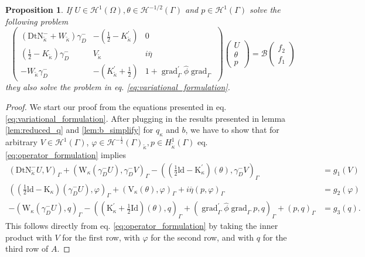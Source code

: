 \documentclass[12pt,journal,compsoc, onecolumn]{IEEEtran}
\newtheorem{proposition}[theorem]{Proposition}
\begin{document}
\begin{proposition}
\label{prop:operator_formulation}
If \(U \in \mathcal{H}^{1}(\Omega), \theta \in \mathcal{H}^{-1 / 2}(\Gamma)\) and \(p \in \mathcal{H}^{1}(\Gamma)\) solve the following problem 
    \begin{equation}
    \label{eq:operator_formulation}
        \begin{pmatrix}
            (\mathrm{DtN}_{\tilde \kappa}^{-} + W_{\tilde \kappa}) \gamma_D^- & - (\frac{1}{2} - K^\prime_{\tilde \kappa}) & 0 \\
            (\frac{1}{2} - K_{\tilde \kappa})\gamma_D^- & V_{\tilde \kappa} & i \overline{\eta} \\
            - W_{\tilde \kappa}\gamma_D^- & - (K^\prime_{\tilde \kappa} + \frac{1}{2}) & 1 + \operatorname{grad}_{\Gamma}^\prime \hat{\phi}\operatorname{grad}_{\Gamma} 
        \end{pmatrix}
        \begin{pmatrix}
            U \\ \theta\\ p 
        \end{pmatrix}
        = \mathcal{B}\begin{pmatrix}
            f_2 \\ f_1
        \end{pmatrix}
    \end{equation}
    they also solve the problem in eq. \ref{eq:variational_formulation}.
\end{proposition}
\begin{proof}
    We start our proof from the equations presented in eq. \ref{eq:variational_formulation}. After plugging in the results presented in lemma \ref{lem:reduced_q} and \ref{lem:b_simplify} for $q_\kappa$ and $b$, we have to show that for arbitrary $V \in \mathcal{H}^1(\Gamma)$, $\varphi \in \mathcal{H}^{-\frac{1}{2}}(\Gamma)_{\tilde \kappa}, p \in H^{1}_{\tilde \kappa}(\Gamma)$ eq. \ref{eq:operator_formulation} implies 
    \begin{align}
        (\mathrm{DtN}_{\tilde \kappa}^{-}U, V)_\Gamma +\left(\mathrm{W}_{\kappa}\left(\gamma_{D}^{-} U\right), \gamma_{D}^{-} V\right)_{\Gamma}-\left((\frac{1}{2} \mathrm{ld}-\mathrm{K}_{\kappa}^{\prime})(\theta), \gamma_{D}^{-} V\right)_{\Gamma} &=g_1(V) \nonumber \\
        \left((\frac{1}{2} \mathrm{ld}-\mathrm{K}_{\kappa})\left(\gamma_{D}^{-} U\right), \varphi\right)_{\Gamma}+\left(\mathrm{V}_{\kappa}(\theta), \varphi\right)_{\Gamma}+i \overline{\eta}(p, \varphi)_{\Gamma} &={g_2}(\varphi) \nonumber  \\
        -\left(\mathrm{W}_{\kappa}\left(\gamma_{D}^{-} U\right), q\right)_{\Gamma}-\left((\mathrm{K}_{\kappa}^{\prime}+\frac{1}{2} \mathrm{Id})(\theta), q\right)_{\Gamma} + (\operatorname{grad}_{\Gamma}^{\prime} \hat{\phi} \operatorname{grad}_{\Gamma}p, q)_\Gamma +(p, q)_{\Gamma} &=g_3(q). \nonumber
    \end{align}
    This follows directly from eq. \ref{eq:operator_formulation} by taking the inner product with $V$ for the first row, with $\varphi$ for the second row, and with $q$ for the third row of $A$.
\end{proof}  \noindent
\end{document}
